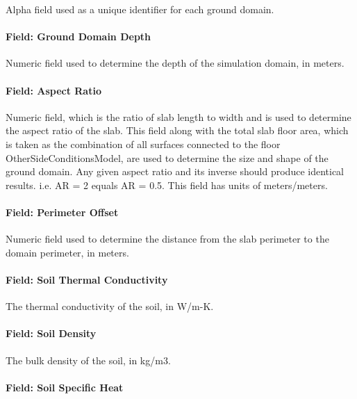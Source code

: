 Alpha field used as a unique identifier for each ground domain.

\paragraph{Field: Ground Domain Depth}\label{field-ground-domain-depth}

Numeric field used to determine the depth of the simulation domain, in meters.

\paragraph{Field: Aspect Ratio}\label{field-aspect-ratio}

Numeric field, which is the ratio of slab length to width and is used to determine the aspect ratio of the slab. This field along with the total slab floor area, which is taken as the combination of all surfaces connected to the floor OtherSideConditionsModel, are used to determine the size and shape of the ground domain. Any given aspect ratio and its inverse should produce identical results. i.e. AR = 2 equals AR = 0.5. This field has units of meters/meters.

\paragraph{Field: Perimeter Offset}\label{field-perimeter-offset}

Numeric field used to determine the distance from the slab perimeter to the domain perimeter, in meters.

\paragraph{Field: Soil Thermal Conductivity}\label{field-soil-thermal-conductivity-3}

The thermal conductivity of the soil, in W/m-K.

\paragraph{Field: Soil Density}\label{field-soil-density-3}

The bulk density of the soil, in kg/m3.

\paragraph{Field: Soil Specific Heat}\label{field-soil-specific-heat-3}

